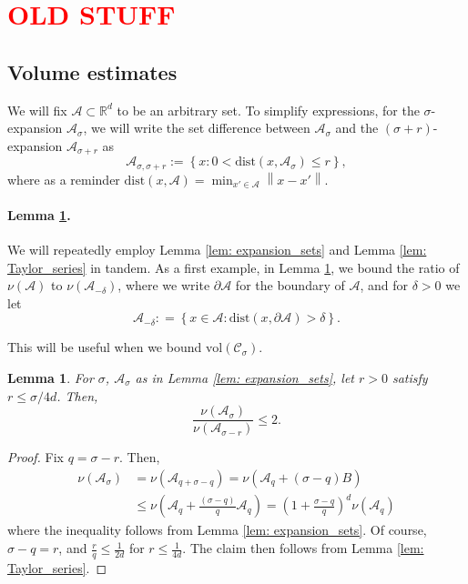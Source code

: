 \documentclass{article}
\newcommand{\set}[1]{\left\{#1\right\}}
\newcommand{\vol}{\mathrm{vol}}
\newcommand{\Reals}{\mathbb{R}}
\newcommand{\Rd}{\Reals^d}
\newcommand{\norm}[1]{\left\lVert#1\right\rVert}
\newcommand{\1}{\mathbf{1}}
\newcommand{\dist}{\mathrm{dist}}
\newcommand{\Cset}{\mathcal{C}}
\newcommand{\Aset}{\mathcal{A}}
\newcommand{\Asig}{\Aset_{\sigma}}
\newcommand{\Csig}{\Cset_{\sigma}}
\newcommand{\Asigr}{\Aset_{\sigma,\sigma + r}}
\theoremstyle{aldenthm}
\newtheorem{lemma}{Lemma}
\begin{document}
\section{\textcolor{red}{OLD STUFF}}

\subsection{Volume estimates}
We will fix $\Aset \subset \Rd$ to be an arbitrary set. To simplify expressions, for the $\sigma$-expansion $\Asig$, we will write the set difference between $\Asig$ and the $(\sigma + r)$-expansion $\Aset_{\sigma + r}$ as 
\begin{equation*}
\Asigr := \set{x: 0 < \dist(x, \Asig) \leq r},
\end{equation*}
where as a reminder $\dist(x, \Aset) = \min_{x' \in \Aset} \norm{x - x'}$.

\paragraph{Lemma \ref{lem: interior_of_expansion_sets}.}

We will repeatedly employ Lemma \ref{lem: expansion_sets} and Lemma \ref{lem: Taylor_series} in tandem. As a first example, in Lemma \ref{lem: interior_of_expansion_sets}, we bound the ratio of $\nu(\Aset)$ to $\nu(\Aset_{-\delta})$, where we write $\partial \Aset$ for the boundary of $\Aset$, and for $\delta > 0$ we let
\begin{equation*}
\Aset_{-\delta} : = \set{x \in \Aset: \dist(x, \partial \Aset) > \delta}.
\end{equation*}

This will be useful when we bound $\vol(\Csig)$.

\begin{lemma}
	\label{lem: interior_of_expansion_sets}
	For $\sigma$, $\Asig$ as in Lemma \ref{lem: expansion_sets}, let $r > 0$ satisfy $r \leq \sigma/4d$. Then,
	\begin{equation*}
	\frac{\nu(\Asig)}{\nu(\Aset_{\sigma - r})} \leq 2.
	\end{equation*}
\end{lemma}
\begin{proof}
	Fix $q = \sigma - r$. Then,
	\begin{align*}
	\nu(\Asig) & = \nu(\Aset_{q + \sigma - q}) = \nu(\Aset_q + (\sigma - q)B ) \\
	& \leq \nu(\Aset_q + \frac{(\sigma - q)}{q} \Aset_q) = \left(1 + \frac{\sigma - q}{q}\right)^d \nu(\Aset_q)
	\end{align*}
	where the inequality follows from Lemma \ref{lem: expansion_sets}. Of course, $\sigma - q = r$, and $\frac{r}{q} \leq \frac{1}{2d}$ for $r \leq \frac{1}{4d}$. The claim then follows from Lemma \ref{lem: Taylor_series}.
\end{proof}

\clearpage


\end{document}
